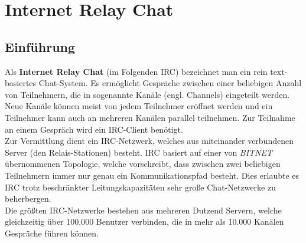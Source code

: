 
\section{Internet Relay Chat}
\subsection{Einführung}
Als \textbf{Internet Relay Chat} (im Folgenden IRC) bezeichnet man ein rein text-basiertes Chat-System. Es ermöglicht Gespräche zwischen einer beliebigen Anzahl von Teilnehmern, die in sogenannte Kanäle (engl. Channels) eingeteilt werden. Neue Kanäle können meist von jedem Teilnehmer eröffnet werden und ein Teilnehmer kann auch an mehreren Kanälen parallel teilnehmen. Zur Teilnahme an einem Gespräch wird ein IRC-Client benötigt. 
\\
Zur Vermittlung dient ein IRC-Netzwerk, welches aus miteinander verbundenen Server (den Relais-Stationen) besteht. 
IRC basiert auf einer von \textit{BITNET} übernommenen Topologie, welche vorschreibt, dass zwischen zwei beliebigen Teilnehmern immer nur genau ein Kommunikationspfad besteht. Dies erlaubte es IRC trotz beschränkter Leitungskapazitäten sehr große Chat-Netzwerke zu  beherbergen.
\\
Die größten IRC-Netzwerke bestehen aus mehreren Dutzend Servern, welche gleichzeitig über 100.000 Benutzer verbinden, die in mehr als 10.000 Kanälen Gespräche führen können.
\\
